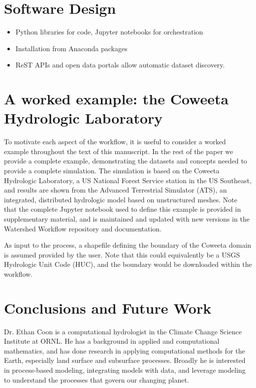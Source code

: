 \documentclass[a4paper,fleqn]{cas-dc}
\begin{document}
\section{Software Design}\label{sec:approach}
%
\begin{itemize}
\item Python libraries for code, Jupyter notebooks for orchestration
\item Installation from Anaconda packages
\item ReST APIs and open data portals allow automatic dataset discovery.
\end{itemize}

\section{A worked example: the Coweeta Hydrologic Laboratory}\label{sec:example}
%
To motivate each aspect of the workflow, it is useful to consider a worked example throughout the text of this manuscript.
In the rest of the paper we provide a complete example, demonstrating the datasets and concepts needed to provide a complete simulation.
The simulation is based on the Coweeta Hydrologic Laboratory, a US National Forest Service station in the US Southeast,\cite{??} and results are shown from the Advanced Terrestrial Simulator\cite{CoonWRR??} (ATS), an integrated, distributed hydrologic model based on unstructured meshes.
Note that the complete Jupyter notebook used to define this example is provided in supplementary material, and is maintained and updated with new versions in the Watershed Workflow repository and documentation.

As input to the process, a shapefile defining the boundary of the Coweeta domain is assumed provided by the user.
Note that this could equivalently be a USGS Hydrologic Unit Code (HUC), and the boundary would be downloaded within the workflow.

\section{Conclusions and Future Work}\label{sec:conclusions}

\printcredits






Dr. Ethan Coon is a computational hydrologist in the Climate Change Science Institute at ORNL.
He has a background in applied and computational mathematics, and has done research in applying computational methods for the Earth, especially land surface and subsurface processes.
Broadly he is interested in process-based modeling, integrating models with data, and leverage modeling to understand the processes that govern our changing planet.
\endbio
\end{document}
